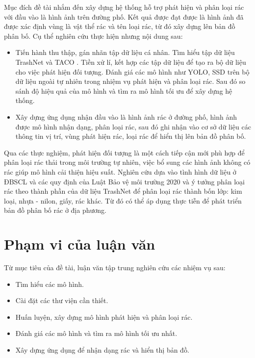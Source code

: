 \documentclass[../the.tex]{subfiles}
\begin{document}
{\fontsize{13}{12} \selectfont

Mục đích đề tài nhắm đến xây dựng hệ thống hỗ trợ phát hiện và phân loại rác với đầu vào là hình ảnh trên đường phố. Kết quả được đạt được là hình ảnh đã được xác định vùng là vật thể rác và tên loại rác, từ đó xây dựng lên bản đồ phân bố. Cụ thể nghiên cứu thực hiện nhưng nội dung sau:

\begin{itemize}
  \item Tiến hành thu thập, gán nhãn tập dữ liệu cá nhân. Tìm hiểu tập dữ liệu TrashNet \cite{yang2016classification} và TACO \cite{proença2020taco}. Tiền xử lí, kết hợp các tập dữ liệu để tạo ra bộ dữ liệu cho việc phát hiện đối tượng.
  Đánh giá các mô hình như YOLO, SSD trên bộ dữ liệu ngoài tự nhiên trong nhiệm vụ phát hiện và phân loại rác. Sau đó so sánh độ hiệu quả của mô hình và tìm ra mô hình tối ưu để xây dựng hệ thống.
  
  \item Xây dựng ứng dụng nhận đầu vào là hình ảnh rác ở đường phố, hình ảnh được mô hình nhận dạng, phân loại rác, sau đó ghi nhận vào cơ sở dữ liệu các thông tin vị trí, vùng phát hiện rác, loại rác để hiển thị lên bản đồ phân bố.
 
\end{itemize}

}

{\fontsize{13}{12} \selectfont

Qua các thực nghiệm, phát hiện đối tượng là một cách tiếp cận mới phù hợp để phân loại rác thải trong môi trường tự nhiên, việc bổ sung các hình ảnh không có rác giúp mô hình cải thiện hiệu suất. 
Nghiên cứu dựa vào tình hình dữ liệu ở ĐBSCL và các quy định của Luật Bảo vệ môi trường 2020 và ý tưởng phân loại rác theo thành phần của dữ liệu TrashNet để phân loại rác thành bốn lớp: kim loại, nhựa - nilon, giấy, rác khác. Từ đó có thể áp dụng thực tiễn để phát triển bản đồ phân bố rác ở địa phương. 

}


\section{Phạm vi của luận văn}
\label{pham_vi}

{\fontsize{13}{12} \selectfont

Từ mục tiêu của đề tài, luận văn tập trung nghiên cứu các nhiệm vụ sau:

\begin{itemize}
  \item Tìm hiểu các mô hình.
  \item Cài đặt các thư viện cần thiết.
  \item Huấn luyện, xây dựng mô hình phát hiện và phân loại rác.
  \item Đánh giá các mô hình và tìm ra mô hình tối ưu nhất.
  \item Xây dựng ứng dụng để nhận dạng rác và hiển thị bản đồ.
\end{itemize}

}
\end{document}
